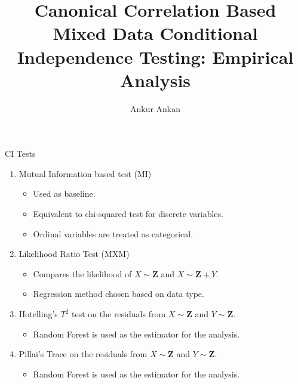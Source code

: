 \documentclass{beamer}
\begin{document}
\title[]{Canonical Correlation Based Mixed Data Conditional Independence Testing: Empirical Analysis}
\author{Ankur Ankan}
\date{}

\maketitle

\begin{frame}{CI Tests}
	\begin{enumerate}
		\item Mutual Information based test (MI) \footnotemark
			\begin{itemize}
				\item Used as baseline.
				\item Equivalent to chi-squared test for discrete variables.
				\item Ordinal variables are treated as categorical.
			\end{itemize}
		\item Likelihood Ratio Test (MXM) \footnotemark
			\begin{itemize}
				\item Compares the likelihood of $ X \sim \bm{Z} $ and $ X \sim \bm{Z} + Y $.
				\item Regression method chosen based on data type.
			\end{itemize}
		\item Hotelling's $T^2$ test on the residuals from $ X \sim \mathbf{Z} $ and $ Y \sim \mathbf{Z} $. \footnotemark 
			\begin{itemize}
				\item Random Forest is used as the estimator for the analysis.
			\end{itemize}
		\item Pillai's Trace on the residuals from $ X \sim \mathbf{Z} $ and $ Y \sim \mathbf{Z} $.
			\begin{itemize}
				\item Random Forest is used as the estimator for the analysis.
			\end{itemize}
	\end{enumerate}


\end{frame}
\end{document}
